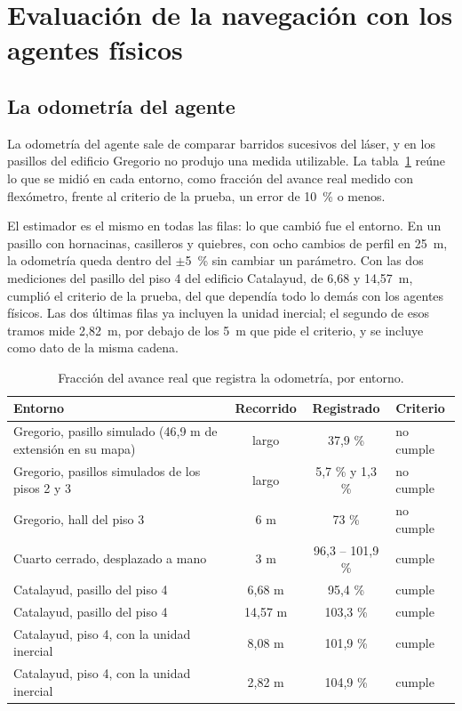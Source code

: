 \section{Evaluación de la navegación con los agentes físicos}
\label{sec:res-hw}

\subsection{La odometría del agente}

La odometría del agente sale de comparar barridos sucesivos del láser, y en los pasillos del edificio Gregorio no produjo una medida utilizable. La tabla~\ref{tab:odometria}
reúne lo que se midió en cada entorno, como fracción del avance real medido con flexómetro, frente al criterio de la prueba, un error de 10~\% o menos.

El estimador es el mismo en todas las filas: lo que cambió fue el entorno. En un pasillo con hornacinas, casilleros y quiebres, con ocho cambios de perfil en 25~m, la odometría queda dentro del $\pm$5~\% sin cambiar un parámetro. Con las dos mediciones del pasillo del piso 4 del edificio Catalayud, de 6,68 y 14,57~m, cumplió el criterio de la prueba, del que dependía todo lo demás con los agentes físicos. Las dos últimas filas ya incluyen la unidad inercial; el segundo de esos tramos mide 2,82~m, por debajo de los 5~m que pide el criterio, y se incluye como dato de la misma cadena.

\begin{table}[H]
  \centering\footnotesize{}
  \caption{Fracción del avance real que registra la odometría, por entorno.}
  \label{tab:odometria}
  \begin{tabular}{@{}>{\raggedright\arraybackslash}p{}ccl@{}}
    \toprule
    \textbf{Entorno} & \textbf{Recorrido} & \textbf{Registrado} & \textbf{Criterio} \\ \midrule
    Gregorio, pasillo simulado (46,9 m de extensión en su mapa) & largo & 37,9 \% & no cumple \\
    Gregorio, pasillos simulados de los pisos 2 y 3 & largo & 5,7 \% y 1,3 \% & no cumple \\
    Gregorio, hall del piso 3 & 6 m & 73 \% & no cumple \\
    Cuarto cerrado, desplazado a mano & 3 m & 96,3 -- 101,9 \% & cumple \\
    Catalayud, pasillo del piso 4 & 6,68 m & 95,4 \% & cumple \\
    Catalayud, pasillo del piso 4 & 14,57 m & 103,3 \% & cumple \\
    Catalayud, piso 4, con la unidad inercial & 8,08 m & 101,9 \% & cumple \\
    Catalayud, piso 4, con la unidad inercial & 2,82 m & 104,9 \% & cumple \\ \bottomrule
  \end{tabular}
\end{table}

